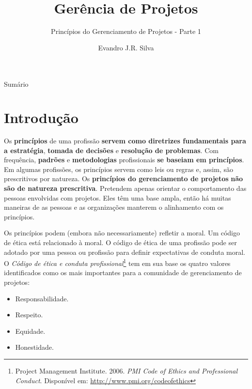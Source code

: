 \documentclass{beamer}
\title[GP 02]{Gerência de Projetos}
\subtitle{Princípios do Gerenciamento de Projetos - Parte 1}
\author[E.J.R. Silva]{Evandro J.R. Silva}
\date{}
\begin{document}
    
\begin{frame}
    \titlepage
\end{frame}

\begin{frame}{Sumário}
    \small
    \tableofcontents
\end{frame}

\section{Introdução}

\begin{frame}
	\justifying
	Os \textbf{princípios} de uma profissão \textbf{servem como diretrizes fundamentais para a estratégia}, \textbf{tomada de decisões} e \textbf{resolução de problemas}. Com frequência, \textbf{padrões} e \textbf{metodologias} profissionais \textbf{se baseiam em princípios}. Em algumas profissões, os princípios servem como leis ou regras e, assim, são prescritivos por natureza. Os \textbf{princípios do gerenciamento de projetos} \textbf{\alert{não} são de natureza prescritiva}. Pretendem apenas orientar o comportamento das pessoas envolvidas com projetos. Eles têm uma base ampla, então há muitas maneiras de as pessoas e as organizações manterem o alinhamento com os princípios.
\end{frame}

\begin{frame}
	\justifying
	Os princípios podem (embora não necessariamente) refletir a moral. Um código de ética está relacionado à moral. O código de ética de uma profissão pode ser adotado por uma pessoa ou profissão para definir expectativas de conduta moral. O \textit{Código de ética e conduta profissional}\footnote{Project Management Institute. 2006. \textit{PMI Code of Ethics and Professional Conduct}. Disponível em: \url{http://www.pmi.org/codeofethics}} tem em sua base os quatro valores identificados como os mais importantes para a comunidade de gerenciamento de projetos:
	\begin{itemize}
		\justifying
		\item Responsabilidade.
		\item Respeito.
		\item Equidade.
		\item Honestidade.
	\end{itemize}
\end{frame}
\end{document}
